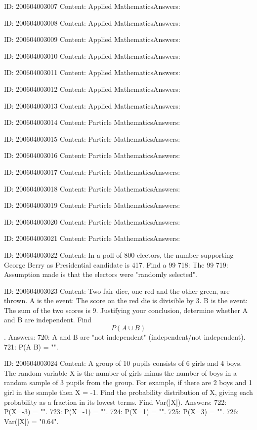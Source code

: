 \documentclass{article}
\begin{document}
ID: 200604003007
Content:
Applied MathematicsAnswers:

ID: 200604003008
Content:
Applied MathematicsAnswers:

ID: 200604003009
Content:
Applied MathematicsAnswers:

ID: 200604003010
Content:
Applied MathematicsAnswers:

ID: 200604003011
Content:
Applied MathematicsAnswers:

ID: 200604003012
Content:
Applied MathematicsAnswers:

ID: 200604003013
Content:
Applied MathematicsAnswers:

ID: 200604003014
Content:
Particle MathematicsAnswers:

ID: 200604003015
Content:
Particle MathematicsAnswers:

ID: 200604003016
Content:
Particle MathematicsAnswers:

ID: 200604003017
Content:
Particle MathematicsAnswers:

ID: 200604003018
Content:
Particle MathematicsAnswers:

ID: 200604003019
Content:
Particle MathematicsAnswers:

ID: 200604003020
Content:
Particle MathematicsAnswers:

ID: 200604003021
Content:
Particle MathematicsAnswers:

ID: 200604003022
Content:
In a poll of 800 electors, the number supporting George Berry as Presidential candidate is 417. Find a 99%
718: The 99%
719: Assumption made is that the electors were "randomly selected".

ID: 200604003023
Content:
Two fair dice, one red and the other green, are thrown. A is the event: The score on the red die is divisible by 3. B is the event: The sum of the two scores is 9. Justifying your conclusion, determine whether A and B are independent.  Find $$P(A \cup B)$$. Answers:
720: A and B are "not independent" (independent/not independent).
721: P(A \cup B) = "".

ID: 200604003024
Content:
A group of 10 pupils consists of 6 girls and 4 boys. The random variable X is the number of girls minus the number of boys in a random sample of 3 pupils from the group. For example, if there are 2 boys and 1 girl in the sample then X = -1. Find the probability distribution of X, giving each probability as a fraction in its lowest terms. Find Var(|X|). Answers:
722: P(X=-3) = "".
723: P(X=-1) = "".
724: P(X=1) = "".
725: P(X=3) = "".
726: Var(|X|) = "0.64".
\end{document}
